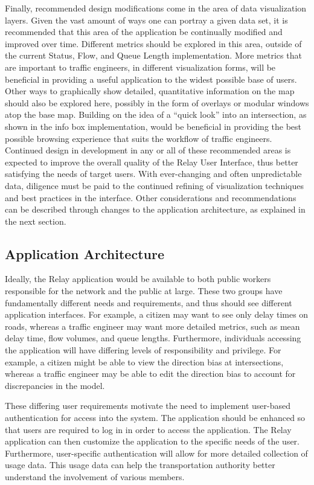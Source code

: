 \documentclass{report}
\begin{document}
Finally, recommended design modifications come in the area of data visualization layers.
Given the vast amount of ways one can portray a given data set, it is recommended that this area of the application be continually modified and improved over time.
Different metrics should be explored in this area, outside of the current Status, Flow, and Queue Length implementation.
More metrics that are important to traffic engineers, in different visualization forms, will be beneficial in providing a useful application to the widest possible base of users.
Other ways to graphically show detailed, quantitative information on the map should also be explored here, possibly in the form of overlays or modular windows atop the base map.
Building on the idea of a ``quick look'' into an intersection, as shown in the info box implementation, would be beneficial in providing the best possible browsing experience that suits the workflow of traffic engineers.
Continued design in development in any or all of these recommended areas is expected to improve the overall quality of the Relay User Interface, thus better satisfying the needs of target users.
With ever-changing and often unpredictable data, diligence must be paid to the continued refining of visualization techniques and best practices in the interface.
Other considerations and recommendations can be described through changes to the application architecture, as explained in the next section.

\subsection{Application Architecture}
\label{subsec:improvements-arch}

Ideally, the Relay application would be available to both public workers responsible for the network and the public at large. These two groups have fundamentally different needs and requirements, and thus should see different application interfaces. For example, a citizen may want to see only delay times on roads, whereas a traffic engineer may want more detailed metrics, such as mean delay time, flow volumes, and queue lengths. Furthermore, individuals accessing the application will have differing levels of responsibility and privilege. For example, a citizen might be able to view the direction bias at intersections, whereas a traffic engineer may be able to edit the direction bias to account for discrepancies in the model.

These differing user requirements motivate the need to implement user-based authentication for access into the system. The application should be enhanced so that users are required to log in in order to access the application. The Relay application can then customize the application to the specific needs of the user. Furthermore, user-specific authentication will allow for more detailed collection of usage data. This usage data can help the transportation authority better understand the involvement of various members.
\end{document}
